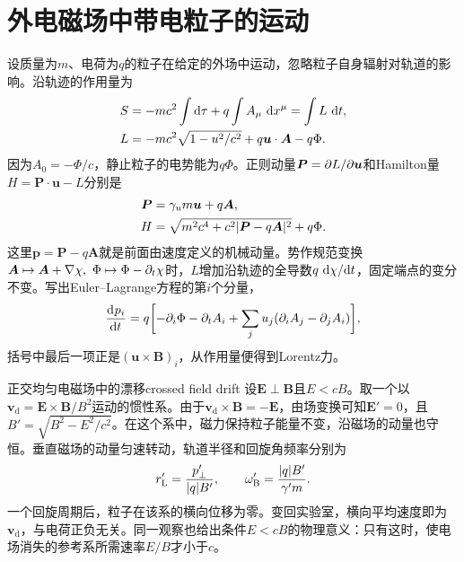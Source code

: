 \section{外电磁场中带电粒子的运动}
设质量为$m$、电荷为$q$的粒子在给定的外场中运动，忽略粒子自身辐射对轨道的影响。沿轨迹的作用量为
\begin{subequations}
    \label{eq:ed-particle-action}
    \begin{align}
        S &= -mc^2\int\mathop{}\!\mathrm{d}\tau + q\int A_\mu\,\mathop{}\!\mathrm{d} x^\mu
        = \int L\,\mathop{}\!\mathrm{d} t,\\
        L &= -mc^2\sqrt{1 - u^2/c^2} + q\bm u \cdot \bm A - q\Phi .
    \end{align}
\end{subequations}
因为$A_0 = -\Phi/c$，静止粒子的电势能为$q\Phi$。正则动量$\bm P = \partial L/\partial\bm u$和Hamilton量$H = \bm P \cdot \bm u - L$分别是
\begin{subequations}
    \begin{align}
        \bm P &= \gamma_um\bm u + q\bm A,\\
        H &= \sqrt{m^2c^4 + c^2\lvert\bm P - q\bm A\rvert^2} + q\Phi.
    \end{align}
\end{subequations}
这里$\bm p = \bm P - q\bm A$就是前面由速度定义的机械动量。势作规范变换$\bm A \mapsto \bm A + \nabla\chi,\ \Phi \mapsto \Phi - \partial_t\chi$时，$L$增加沿轨迹的全导数$q\,\mathop{}\!\mathrm{d}\chi/\mathrm{d} t$，固定端点的变分不变。写出Euler--Lagrange方程的第$i$个分量，
\[
    \frac{\mathop{}\!\mathrm{d}^{}p_i}{\mathrm{d}{t}^{}} = q\biggl[-\partial_i\Phi - \partial_t A_i
               + \sum_j u_j(\partial_i A_j - \partial_j A_i)\biggr],
\]
括号中最后一项正是$(\bm u \times \bm B)_i$，从作用量便得到Lorentz力。

\begin{example}{正交均匀电磁场中的漂移}{crossed field drift}
    设$\bm E \perp \bm B$且$E < cB$。取一个以$\bm v_\mathrm{d} = \bm E \times \bm B/B^2$运动的惯性系。由于$\bm v_\mathrm{d} \times \bm B = -\bm E$，由场变换可知$\bm E' = 0$，且$B' = \sqrt{B^2 - E^2/c^2}$。在这个系中，磁力保持粒子能量不变，沿磁场的动量也守恒。垂直磁场的动量匀速转动，轨道半径和回旋角频率分别为
    \[
        r_\mathrm{L}' = \frac{p_\perp'}{\lvert q\rvert B'},\qquad
        \omega_\mathrm{B}' = \frac{\lvert q\rvert B'}{\gamma' m}.
    \]
    一个回旋周期后，粒子在该系的横向位移为零。变回实验室，横向平均速度即为$\bm v_\mathrm{d}$，与电荷正负无关。同一观察也给出条件$E < cB$的物理意义：只有这时，使电场消失的参考系所需速率$E/B$才小于$c$。
\end{example}

